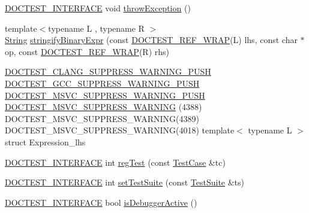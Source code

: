 \begin{DoxyCompactItemize}
\item 
\mbox{\hyperlink{doctest_8h_a9c16ffc635ec47f07797d21ede26b1a5}{D\+O\+C\+T\+E\+S\+T\+\_\+\+I\+N\+T\+E\+R\+F\+A\+CE}} void \mbox{\hyperlink{namespacedoctest_1_1detail_a60ffd50b9ee7adfcafc078f333aac8b6}{throw\+Exception}} ()
\item 
{\footnotesize template$<$typename L , typename R $>$ }\\\mbox{\hyperlink{classdoctest_1_1_string}{String}} \mbox{\hyperlink{namespacedoctest_1_1detail_a6879a79aea397a22e296e4afd0a90e3b}{stringify\+Binary\+Expr}} (const \mbox{\hyperlink{doctest_8h_af2901cafb023c57fb672ccb1bf14f2eb}{D\+O\+C\+T\+E\+S\+T\+\_\+\+R\+E\+F\+\_\+\+W\+R\+AP}}(L) lhs, const char $\ast$op, const \mbox{\hyperlink{doctest_8h_af2901cafb023c57fb672ccb1bf14f2eb}{D\+O\+C\+T\+E\+S\+T\+\_\+\+R\+E\+F\+\_\+\+W\+R\+AP}}(R) rhs)
\item 
\mbox{\hyperlink{doctest_8h_a628491cf2971a026350d5401986bf6d3}{D\+O\+C\+T\+E\+S\+T\+\_\+\+C\+L\+A\+N\+G\+\_\+\+S\+U\+P\+P\+R\+E\+S\+S\+\_\+\+W\+A\+R\+N\+I\+N\+G\+\_\+\+P\+U\+SH}} \mbox{\hyperlink{doctest_8h_a8015d10af2883db80a955ce0d523886d}{D\+O\+C\+T\+E\+S\+T\+\_\+\+G\+C\+C\+\_\+\+S\+U\+P\+P\+R\+E\+S\+S\+\_\+\+W\+A\+R\+N\+I\+N\+G\+\_\+\+P\+U\+SH}} \mbox{\hyperlink{doctest_8h_aec6d713a9dde361b8e68afe78c5bf3cf}{D\+O\+C\+T\+E\+S\+T\+\_\+\+M\+S\+V\+C\+\_\+\+S\+U\+P\+P\+R\+E\+S\+S\+\_\+\+W\+A\+R\+N\+I\+N\+G\+\_\+\+P\+U\+SH}} \mbox{\hyperlink{namespacedoctest_1_1detail_a3b966d87ac1e25498fae773355c43d90}{D\+O\+C\+T\+E\+S\+T\+\_\+\+M\+S\+V\+C\+\_\+\+S\+U\+P\+P\+R\+E\+S\+S\+\_\+\+W\+A\+R\+N\+I\+NG}} (4388) D\+O\+C\+T\+E\+S\+T\+\_\+\+M\+S\+V\+C\+\_\+\+S\+U\+P\+P\+R\+E\+S\+S\+\_\+\+W\+A\+R\+N\+I\+NG(4389) D\+O\+C\+T\+E\+S\+T\+\_\+\+M\+S\+V\+C\+\_\+\+S\+U\+P\+P\+R\+E\+S\+S\+\_\+\+W\+A\+R\+N\+I\+NG(4018) template$<$ typename L $>$ struct Expression\+\_\+lhs
\item 
\mbox{\hyperlink{doctest_8h_a9c16ffc635ec47f07797d21ede26b1a5}{D\+O\+C\+T\+E\+S\+T\+\_\+\+I\+N\+T\+E\+R\+F\+A\+CE}} int \mbox{\hyperlink{namespacedoctest_1_1detail_a00f99edefb8490a8e2602d58c96431f4}{reg\+Test}} (const \mbox{\hyperlink{structdoctest_1_1detail_1_1_test_case}{Test\+Case}} \&tc)
\item 
\mbox{\hyperlink{doctest_8h_a9c16ffc635ec47f07797d21ede26b1a5}{D\+O\+C\+T\+E\+S\+T\+\_\+\+I\+N\+T\+E\+R\+F\+A\+CE}} int \mbox{\hyperlink{namespacedoctest_1_1detail_ae79cb8df06d35468dd0ba9f04c85802c}{set\+Test\+Suite}} (const \mbox{\hyperlink{structdoctest_1_1detail_1_1_test_suite}{Test\+Suite}} \&ts)
\item 
\mbox{\hyperlink{doctest_8h_a9c16ffc635ec47f07797d21ede26b1a5}{D\+O\+C\+T\+E\+S\+T\+\_\+\+I\+N\+T\+E\+R\+F\+A\+CE}} bool \mbox{\hyperlink{namespacedoctest_1_1detail_a013828c4e677241cc26aeea33f762710}{is\+Debugger\+Active}} ()

\end{DoxyCompactItemize}
